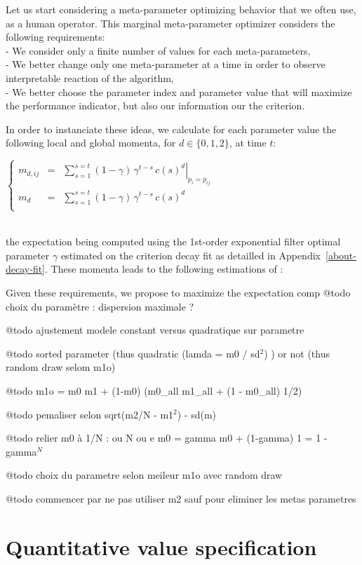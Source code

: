 \documentclass{article}
\newcommand{\eqline}[1]{\\\centerline{$#1$}\\}
\begin{document}
Let us start considering a meta-parameter optimizing behavior that we often use, as a human operator. This marginal meta-parameter optimizer considers the following requirements:
\\ - We consider only a finite number of values for each meta-parameters,
\\ - We better change only one meta-parameter at a time in order to observe interpretable reaction of the algorithm,
\\ - We better choose the parameter index and parameter value that will maximize the performance indicator, but also our information our the criterion.

In order to instanciate these ideas, we calculate for each parameter value the following local and global momenta, for $d \in \{0, 1, 2\}$, at time $t$:
\eqline{\left\{\begin{array}{rcl}
 m_{d,ij} &=& \left.\sum_{s=1}^{s=t} (1 - \gamma) \, \gamma^{t-s} \, c(s)^d\right|_{p_i = p_{ij}}\\
 m_{d} &=& \sum_{s=1}^{s=t} (1 - \gamma) \, \gamma^{t-s} \, c(s)^d\\
\end{array}\right.}
the expectation being computed using the 1st-order exponential filter optimal parameter $\gamma$ estimated on the criterion decay fit as detailled in Appendix~\ref{about-decay-fit}. These momenta leads to the following estimations of :

Given these requirements, we propose to maximize the expectation comp
@todo choix du paramètre : dispersion maximale ? 

@todo ajustement modele constant versus quadratique sur parametre 

@todo sorted parameter (thus quadratic (lamda = m0 / sd$^2$) ) or not (thus random draw selom m1o)

@todo  m1o = m0 m1 + (1-m0) (m0\_all m1\_all + (1 - m0\_all) 1/2)

@todo  pemaliser selon sqrt(m2/N - m1$^2$) - sd(m) 

@todo  relier m0 à 1/N : ou N ou e m0 = gamma m0 + (1-gamma) 1 = 1 - gamma$^N$

@todo choix du parametre selon meileur m1o avec random draw 

@todo commencer par ne pas utiliser m2 sauf pour eliminer les metas parametres 

\appendix

\clearpage \section{Quantitative value specification} \label{about-quantitative-values}
\end{document}
